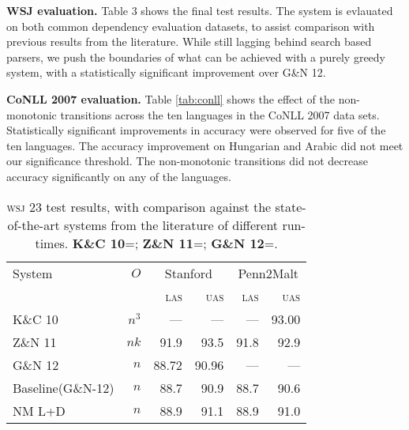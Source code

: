 \documentclass[11pt,letterpaper]{article}
\newcommand{\las}{\textsc{las}\xspace}
\newcommand{\uas}{\textsc{uas}\xspace}
\newcommand{\wsj}{\textsc{wsj}\xspace}
\begin{document}
\noindent \textbf{WSJ evaluation.}
Table 3 shows the final test results. The system is evlauated on both common
dependency evaluation datasets, to assist comparison with previous results from the
literature. While still lagging behind search based parsers, we push the boundaries
of what can be achieved with a purely greedy system, with a statistically significant
improvement over G\&N 12.

\noindent \textbf{CoNLL 2007 evaluation.}
Table \ref{tab:conll} shows the effect of the non-monotonic transitions across
the ten languages in the CoNLL 2007 data sets. Statistically significant improvements
in accuracy were observed for five of the ten languages. The accuracy improvement
on Hungarian and Arabic did not meet our significance threshold.
The non-monotonic transitions did not decrease accuracy significantly on any of
the languages.


\begin{table}
    \centering
    \small
    \begin{tabular}{l|r|rr|rr}
        \hline 
System  &   $O$ &  \multicolumn{2}{c}{Stanford} & \multicolumn{2}{|c}{Penn2Malt} \\
        &       &  \las  & \uas  & \las & \uas \\
        \hline \hline
K\&C 10  & $n^3$ & ---   & ---   & ---  & 93.00 \\
Z\&N 11  & $nk$  & 91.9  & 93.5  & 91.8 & 92.9 \\
G\&N 12  & $n$   & 88.72 & 90.96 & ---  & --- \\
        \hline
Baseline(G\&N-12)   & $n$ & 88.7 & 90.9 & 88.7  & 90.6 \\
NM L+D      & $n$ & 88.9 & 91.1 & 88.9  & 91.0 \\
\hline
    \end{tabular}
    \caption{\small \wsj 23 test results, with comparison against the
        state-of-the-art systems from the literature of different run-times.
        \textbf{K\&C 10}=\citet{koo:10}; \textbf{Z\&N 11}=\citet{zhang:11};
        \textbf{G\&N 12}=\citet{goldberg:12}.
    \label{tab:eval}}
\vspace{-0.5\baselineskip}
\end{table}
\end{document}
